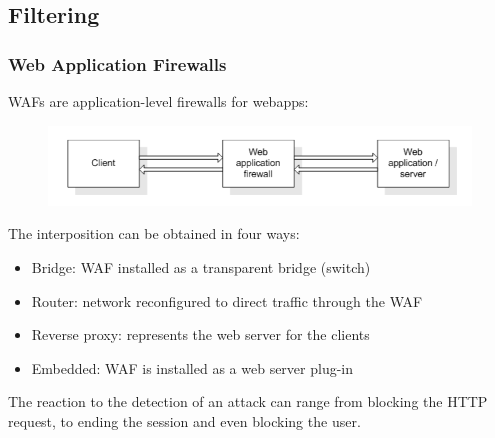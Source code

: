 \documentclass[10pt,a4paper]{report}
\begin{document}
\subsection{Filtering}
\subsubsection{Web Application Firewalls}
WAFs are application-level firewalls for webapps:
\begin{figure}[H]
\centering
\includegraphics[scale=0.4]{17.png}
\end{figure}
The interposition can be obtained in four ways:
\begin{itemize}
\item Bridge: WAF installed as a transparent bridge (switch)
\item Router: network reconfigured to direct traffic through the WAF
\item Reverse proxy: represents the web server for the clients
\item Embedded: WAF is installed as a web server plug-in
\end{itemize}
The reaction to the detection of an attack can range from blocking the HTTP request, to ending the session and even blocking the user.
\end{document}
